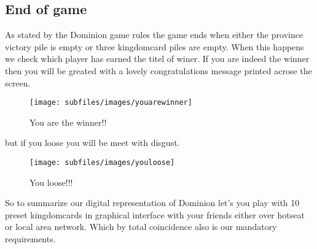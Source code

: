 \subsection{End of game}
As stated by the Dominion game rules the game ends when either the province victory pile is empty or three kingdomcard piles are empty. When this happens we check which player has earned the titel of winer. If you are indeed the winner then you will be greated with a lovely congratulations message printed acrose the screen.
\begin{figure}[h!]
\centering
\texttt{[image: subfiles/images/youarewinner]}
\caption{You are the winner!!}
\end{figure}
but if you loose you will be meet with disgust.
\begin{figure}[h!]
\centering
\texttt{[image: subfiles/images/youloose]}
\caption{You loose!!!}
\end{figure}
So to summarize our digital representation of Dominion let's you play with 10 preset kingdomcards in graphical interface with your friends either over hotseat or local area network. Which by total coincidence also is our mandatory requirements.
 